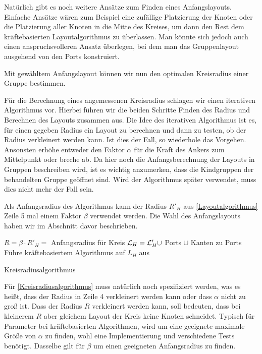 Natürlich gibt es  noch weitere Ansätze zum Finden eines Anfangslayouts.
Einfache Ansätze wären zum Beispiel eine zufällige Platzierung der Knoten oder die Platzierung aller Knoten in die Mitte des Kreises, 
um dann den Rest dem kräftebasierten Layoutalgorithmus zu überlassen. 
Man könnte sich jedoch auch einen anspruchsvolleren Ansatz überlegen, bei dem man das Gruppenlayout ausgehend von den Ports konstruiert.

Mit gewähltem Anfangslayout können wir nun den optimalen Kreisradius einer Gruppe bestimmen.



Für die Berechnung eines angemessenen Kreisradius schlagen wir einen iterativen Algorithmus vor. \label{Radius}
Hierbei führen wir die beiden Schritte Finden des Radius und Berechnen des Layouts zusammen aus.
Die Idee des iterativen Algorithmus ist es, für einen gegeben Radius ein Layout zu berechnen und dann zu testen, ob der Radius verkleinert werden kann.
Ist dies der Fall, so wiederhole das Vorgehen. Ansonsten erhöhe entweder den Faktor $\alpha$ für die Kraft des Ankers zum Mittelpunkt oder breche ab. 
Da hier noch die Anfangsberechnung der Layouts in Gruppen beschreiben wird, ist es wichtig anzumerken, dass die Kindgruppen der behandelten Gruppe 
geöffnet sind.
Wird der Algorithmus später verwendet, muss dies nicht mehr der Fall sein.

Als Anfangsradius des Algorithmus kann der Radius $R'_H$ aus \autoref{Layoutalgorithmus} Zeile 5 mal einem Faktor $\beta$ verwendet werden.
Die Wahl des Anfangslayouts haben wir im Abschnitt davor beschrieben.

\vspace{1cm}

\begin{algorithm}[H]
\SetAlgoLined
{}
$R = \beta \cdot R'_H = $ Anfangsradius für Kreis\;
$\mathcal{L}_H = \mathcal{L}'_H \cup$ Ports $\cup$  Kanten zu Ports\;
Führe kräftebasiertem Algorithmus auf  $L_H$ aus\;
\caption{Kreisradiusalgorithmus}
\label{Kreisradiusalgorithmus}
\end{algorithm}

Für \autoref{Kreisradiusalgorithmus} muss natürlich noch spezifiziert werden, was es heißt, dass der Radius in Zeile 4 verkleinert werden kann
oder dass $\alpha$ nicht zu groß ist. 
Dass der Radius $R$ verkleinert werden kann, soll bedeuten, dass bei kleinerem $R$ aber gleichem Layout der Kreis keine Knoten schneidet. 
Typisch für Parameter bei kräftebasierten Algorithmen, wird um eine geeignete maximale Größe von $\alpha$ zu finden, wohl eine Implementierung und verschiedene Tests benötigt. 
Dasselbe gilt für $\beta$ um einen geeigneten Anfangsradius zu finden.

